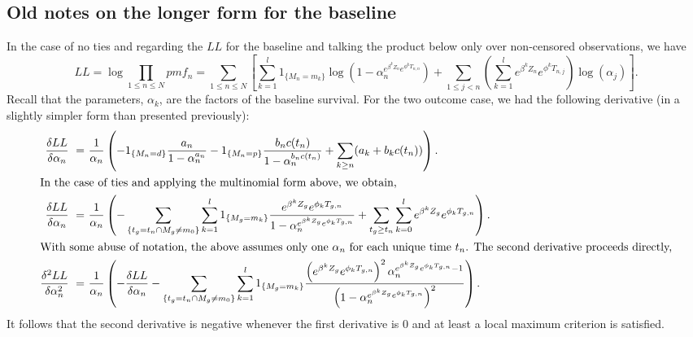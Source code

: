 \documentclass[10pt]{article}
\begin{document}
\subsection{Old notes on the longer form for the baseline}
In the case of no ties and regarding the $LL$ for the baseline and talking the product below only over non-censored observations, we have
	$$LL=\log{\prod_{1 \le n \le N} pmf_n}=\sum_{1 \le n \le N} \left[{\sum_{k=1}^l1_{\{M_n=m_k\}}\log(1-\alpha_n^{e^{\beta^k Z_n}e^{\phi^kT_{n,n}}}) +
	\sum_{1 \le j < n} \left({\sum_{k=1}^le^{\beta^k Z_n}e^{\phi^kT_{n,j}}}\right)\log( \alpha_j )}\right].$$
Recall that the parameters, $\alpha_k$, are the factors of the baseline survival.
For the two outcome case, we had the following derivative (in a slightly simpler form than presented previously):
\begin{align*}
{\delta LL \over \delta \alpha_n}~ =~  & {1\over \alpha_n}\left({- 1_{\{M_n=d\}} {a_n\over 1-\alpha_n^{a_n}} - 1_{\{M_n=p\}} {b_nc(t_n)\over 1-\alpha_n^{b_nc(t_n)}} 
+\sum_{k\ge n}(a_k+b_kc(t_n))}\right).\\
\intertext{In the case of ties and applying the multinomial form above, we obtain,}
{\delta LL \over \delta \alpha_n}~ =~  & {1\over \alpha_n}\left({- \sum_{\{t_g=t_n \cap M_g\not = m_0\}} \sum_{k=1}^l 1_{\{M_g=m_k\}}
{e^{\beta^kZ_g}e^{\phi_kT_{g,n}}  \over 1-\alpha_n^{e^{\beta^kZ_g}e^{\phi_kT_{g,n}}}  }
+\sum_{t_g\ge t_n}\sum_{k=0}^l e^{\beta^kZ_g}e^{\phi_kT_{g,n}}}\right).\\
\intertext{With some abuse of notation, the above assumes only one $\alpha_n$ for each unique time $t_n$.  The second derivative proceeds directly,}
{\delta^2 LL \over \delta \alpha_n^2}~ =~  & {1\over \alpha_n}\left({ -{\delta LL\over \delta \alpha_n} - \sum_{\{t_g=t_n \cap M_g\not = m_0\}} \sum_{k=1}^l 
1_{\{M_g=m_k\}}
{\left({e^{\beta^kZ_g}e^{\phi_kT_{g,n}} }\right)^2 \alpha_n^{e^{\beta^kZ_g}e^{\phi_kT_{g,n}}-1} \over \left({1-\alpha_n^{e^{\beta^kZ_g}e^{\phi_kT_{g,n}}} }\right)^2  }
}\right).
\end{align*}
It follows that the second derivative is negative whenever the first derivative is 0 and at least a local maximum criterion is satisfied.
\end{document}
